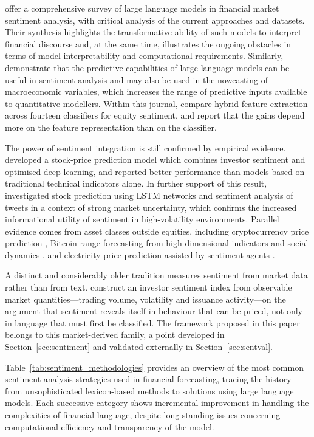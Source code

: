\citet{liu24} offer a comprehensive survey of large language models in financial market
sentiment analysis, with critical analysis of the current approaches and datasets. Their
synthesis highlights the transformative ability of such models to interpret financial
discourse and, at the same time, illustrates the ongoing obstacles in terms of model
interpretability and computational requirements. Similarly, \citet{onozo24} demonstrate
that the predictive capabilities of large language models can be useful in sentiment
analysis and may also be used in the nowcasting of macroeconomic variables, which
increases the range of predictive inputs available to quantitative modellers. Within this
journal, \citet{george25} compare hybrid feature extraction across fourteen classifiers
for equity sentiment, and report that the gains depend more on the feature representation
than on the classifier.

The power of sentiment integration is still confirmed by empirical evidence.
\citet{mu23} developed a stock-price prediction model which combines investor sentiment
and optimised deep learning, and reported better performance than models based on
traditional technical indicators alone. In further support of this result,
\citet{bacco24} investigated stock prediction using LSTM networks and sentiment analysis
of tweets in a context of strong market uncertainty, which confirms the increased
informational utility of sentiment in high-volatility environments. Parallel evidence
comes from asset classes outside equities, including cryptocurrency price prediction
\citep{parekh22,otabek22}, Bitcoin range forecasting from high-dimensional indicators and
social dynamics \citep{shang25}, and electricity price prediction assisted by
sentiment agents \citep{lu25}.

A distinct and considerably older tradition measures sentiment from market data rather
than from text. \citet{bakerwurgler07} construct an investor sentiment index from
observable market quantities---trading volume, volatility and issuance activity---on the
argument that sentiment reveals itself in behaviour that can be priced, not only in
language that must first be classified. The framework proposed in this paper belongs to
this market-derived family, a point developed in Section~\ref{sec:sentiment} and validated
externally in Section~\ref{sec:sentval}.

Table~\ref{tab:sentiment_methodologies} provides an overview of the most common
sentiment-analysis strategies used in financial forecasting, tracing the history from
unsophisticated lexicon-based methods to solutions using large language models. Each
successive category shows incremental improvement in handling the complexities of
financial language, despite long-standing issues concerning computational efficiency and
transparency of the model.

